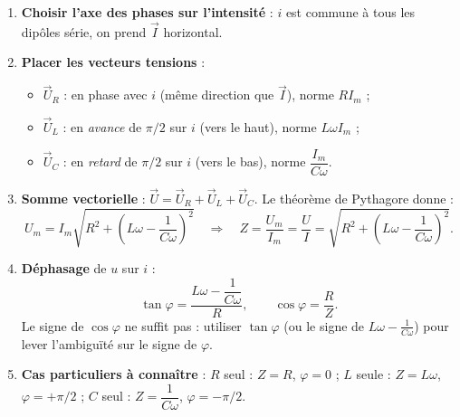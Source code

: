 \documentclass[11pt]{article}
\begin{document}
\begin{methode}
\begin{enumerate}
\item \textbf{Choisir l'axe des phases sur l'intensité} : $i$ est commune à tous les dipôles série, on prend $\vec{I}$ horizontal.
\item \textbf{Placer les vecteurs tensions} :
\begin{itemize}
\item $\vec{U}_R$ : en phase avec $i$ (même direction que $\vec{I}$), norme $RI_m$ ;
\item $\vec{U}_L$ : en \emph{avance} de $\pi/2$ sur $i$ (vers le haut), norme $L\omega I_m$ ;
\item $\vec{U}_C$ : en \emph{retard} de $\pi/2$ sur $i$ (vers le bas), norme $\dfrac{I_m}{C\omega}$.
\end{itemize}
\item \textbf{Somme vectorielle} : $\vec{U} = \vec{U}_R + \vec{U}_L + \vec{U}_C$. Le théorème de Pythagore donne :
\[ U_m = I_m\sqrt{R^2 + \left(L\omega - \dfrac{1}{C\omega}\right)^2} \quad\Longrightarrow\quad Z = \dfrac{U_m}{I_m} = \dfrac{U}{I} = \sqrt{R^2 + \left(L\omega - \dfrac{1}{C\omega}\right)^2}. \]
\item \textbf{Déphasage} de $u$ sur $i$ :
\[ \tan\varphi = \dfrac{L\omega - \dfrac{1}{C\omega}}{R}, \qquad \cos\varphi = \dfrac{R}{Z}. \]
Le signe de $\cos\varphi$ ne suffit pas : utiliser $\tan\varphi$ (ou le signe de $L\omega - \tfrac{1}{C\omega}$) pour lever l'ambiguïté sur le signe de $\varphi$.
\item \textbf{Cas particuliers à connaître} : $R$ seul : $Z = R$, $\varphi = 0$ ; $L$ seule : $Z = L\omega$, $\varphi = +\pi/2$ ; $C$ seul : $Z = \dfrac{1}{C\omega}$, $\varphi = -\pi/2$.
\end{enumerate}
\end{methode}
\end{document}
